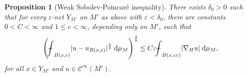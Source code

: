 \documentclass[10pt,letterpaper]{amsart}
\newtheorem{prop}[thm]{Proposition}
\theoremstyle{definition}
\numberwithin{thm}{subsection}
\numberwithin{equation}{section}
\begin{document}
\begin{prop}[Weak Sobolev-Poincar\'{e} inequality]\label{p:weakPI}
There exists $\delta_0>0$ such that for every $\varepsilon$-net $Y_{M'}$ on $M'$ as above with $\varepsilon<\delta_0$, there are constants $0<C<\infty$ and $1\leq c<\infty$, depending only on $M'$, such that
\begin{displaymath}
\left({\mathchoice
          {\mathop{\vrule width 6pt height 3 pt depth -2.5pt
                  \kern -8pt \intop}\nolimits_{{B(x,\varepsilon)}}}          {\mathop{\vrule width 5pt height 3 pt depth -2.6pt
                  \kern -6pt \intop}\nolimits_{{B(x,\varepsilon)}}}          {\mathop{\vrule width 5pt height 3 pt depth -2.6pt
                  \kern -6pt \intop}\nolimits_{{B(x,\varepsilon)}}}          {\mathop{\vrule width 5pt height 3 pt depth -2.6pt
                  \kern -6pt \intop}\nolimits_{{B(x,\varepsilon)}}}}|u-u_{B(x,\varepsilon)}|^{\frac{4}{3}}\;\mathrm{d}\mu_{{M}}\right)^{\frac{3}{4}} \leq C \varepsilon {\mathchoice
          {\mathop{\vrule width 6pt height 3 pt depth -2.5pt
                  \kern -8pt \intop}\nolimits_{{B(x,c\varepsilon)}}}          {\mathop{\vrule width 5pt height 3 pt depth -2.6pt
                  \kern -6pt \intop}\nolimits_{{B(x,c\varepsilon)}}}          {\mathop{\vrule width 5pt height 3 pt depth -2.6pt
                  \kern -6pt \intop}\nolimits_{{B(x,c\varepsilon)}}}          {\mathop{\vrule width 5pt height 3 pt depth -2.6pt
                  \kern -6pt \intop}\nolimits_{{B(x,c\varepsilon)}}}}|\nabla_H u|\;\mathrm{d}\mu_{{M}},
\end{displaymath}
for all $x\in Y_{M'}$ and $u\in \mathcal{C}^{\infty}(M')$.
\end{prop}
\end{document}
